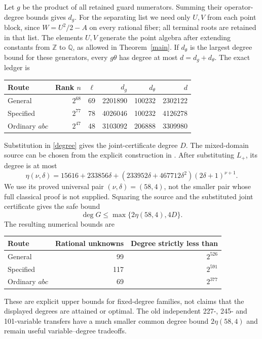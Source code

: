 \documentclass[11pt]{article}
\begin{document}
Let $g$ be the product of all retained guard numerators. Summing their
operator-degree bounds gives $d_g$. For the separating list we need only
$U,V$ from each point block, since $W=U^2/2-A$ on every rational fiber;
all terminal roots are retained in that list. The elements $U,V$ generate
the point algebra after extending constants from $\mathbb Z$ to $\mathbb Q$,
as allowed in Theorem~\ref{main}. If $d_\theta$ is the largest degree bound
for these generators, every $g\theta$ has degree at most $d=d_g+d_\theta$.
The exact ledger is
\begin{center}
\begin{tabular}{lrrrrr}
\toprule
Route & Rank $n$ & $\ell$ & $d_g$ & $d_\theta$ & $d$\\
\midrule
General & $2^{68}$ &69&2201890&100232&2302122\\
Specified & $2^{77}$ &78&4026046&100232&4126278\\
Ordinary $abc$ & $2^{47}$ &48&3103092&206888&3309980\\
\bottomrule
\end{tabular}
\end{center}
Substitution in \eqref{degree} gives the joint-certificate degree $D$.
The mixed-domain source can be chosen from the explicit construction in
\cite[Theorem~3, Definition~5.3 and Section~6.1]{BDHMS}. After substituting
$L_+$, its degree is at most
\[
\eta(\nu,\delta)=15616+233856\delta+
 (233952\delta+467712\delta^2)(2\delta+1)^{\nu+1}.
\]
We use its proved universal pair $(\nu,\delta)=(58,4)$, not the smaller
pair whose full classical proof is not supplied. Squaring the source and
the substituted joint certificate gives the safe bound
\[
                  \deg G\le\max\{2\eta(58,4),4D\}.
\]
The resulting numerical bounds are
\begin{center}
\begin{tabular}{lrr}
\toprule
Route & Rational unknowns & Degree strictly less than\\
\midrule
General &99&$2^{526}$\\
Specified &117&$2^{591}$\\
Ordinary $abc$ &69&$2^{377}$\\
\bottomrule
\end{tabular}
\end{center}
These are explicit upper bounds for fixed-degree families, not claims
that the displayed degrees are attained or optimal. The old independent
227-, 245- and 101-variable transfers have a much smaller common degree
bound $2\eta(58,4)$ and remain useful variable--degree tradeoffs.
\end{document}
